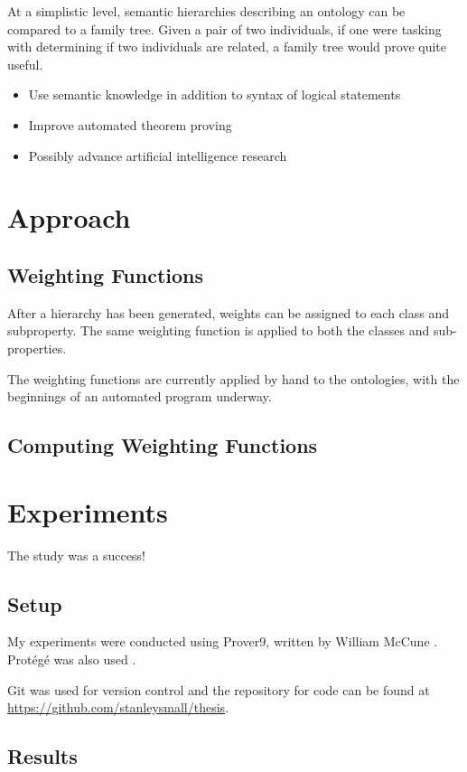 \documentclass{article}
\begin{document}
	At a simplistic level, semantic hierarchies describing an ontology can be compared to a family tree. Given a pair of two individuals, if one were tasking with determining if two individuals are related, a family tree would prove quite useful. 

	
		\begin{itemize}
		    \item Use semantic knowledge in addition to syntax of logical statements
		    \item Improve automated theorem proving
		    \item Possibly advance artificial intelligence research
		\end{itemize}

	\newpage	
	\section{Approach}
		\subsection{Weighting Functions}

After a hierarchy has been generated, weights can be assigned to each class and subproperty. The same weighting function is applied to both the classes and sub-properties. 

The weighting functions are currently applied by hand to the ontologies, with the beginnings of an automated program underway. 

		\subsection{Computing Weighting Functions}

	\newpage
	\section{Experiments}
The study was a success!

		\subsection{Setup}
		My experiments were conducted using Prover9, written by William McCune \cite{mccune2005prover9}. Prot{\'e}g{\'e} was also used \cite{gennari2003evolution}.

Git was used for version control and the repository for code can be found at \url{https://github.com/stanleysmall/thesis}.
		\subsection{Results}
	\newpage
\end{document}
